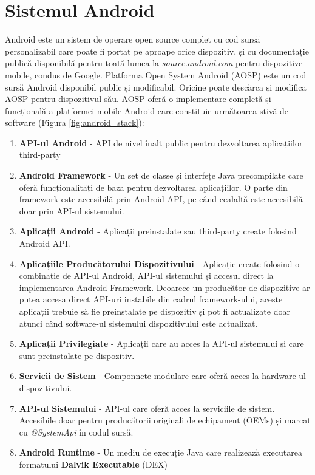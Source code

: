\documentclass[12pt,a4paper]{report}
\begin{document}
\section{Sistemul Android}
Android este un sistem de operare open source complet cu cod sursă personalizabil 
care poate fi portat pe aproape orice dispozitiv, și cu documentație publică disponibilă 
pentru toată lumea la \textit{source.android.com} pentru dispozitive mobile, condus de Google\cite{android-source}.
Platforma Open System Android (AOSP) este un cod sursă Android disponibil public și modificabil. 
Oricine poate descărca și modifica AOSP pentru dispozitivul său. 
AOSP oferă o implementare completă și funcțională a platformei mobile Android care constituie următoarea stivă de software\cite{android-architecture} (Figura \ref{fig:android_stack}):
\begin{enumerate}
    \item \textbf{API-ul Android} - API de nivel înalt public pentru dezvoltarea aplicațiilor third-party
    \item \textbf{Android Framework} - Un set de classe și interfețe Java precompilate care oferă funcționalități de bază pentru dezvoltarea aplicațiilor.
    O parte din framework este accesibilă prin Android API, pe când cealaltă este accesibilă doar prin API-ul sistemului.
    \item \textbf{Aplicații Android} - Aplicații preinstalate sau third-party create folosind Android API.
    \item \textbf{Aplicațiile Producătorului Dispozitivului} - Aplicație create folosind o combinație de API-ul Android, 
    API-ul sistemului și accesul direct la implementarea Android Framework. 
    Deoarece un producător de dispozitive ar putea accesa direct API-uri instabile din cadrul framework-ului, 
    aceste aplicații trebuie să fie preinstalate pe dispozitiv și pot fi actualizate doar atunci când software-ul sistemului 
    dispozitivului este actualizat.
    \item \textbf{Aplicații Privilegiate} - Aplicații care au acces la API-ul sistemului și care sunt preinstalate pe dispozitiv.
    \item \textbf{Servicii de Sistem} - Componnete modulare care oferă acces la hardware-ul dispozitivului.
    \item \textbf{API-ul Sistemului} - API-ul care oferă acces la serviciile de sistem. 
    Accesibile doar pentru producătorii originali de echipament (OEMs) și marcat cu \textit{@SystemApi} în codul sursă.
    \item \textbf{Android Runtime} - Un mediu de execuție Java care realizează executarea formatului \textbf{Dalvik Executable} (DEX) 

\end{enumerate}
\end{document}
